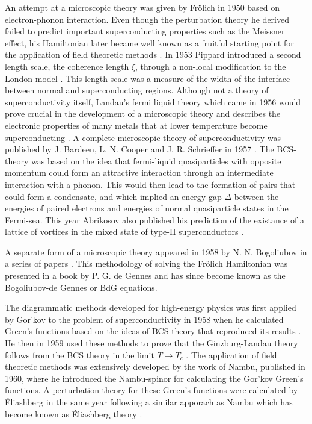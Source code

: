 An attempt at a microscopic theory was given by Fr\"olich in 1950 based on electron-phonon interaction. Even though the perturbation theory he derived
failed to predict important superconducting properties such as the Meissner effect, his Hamiltonian later became well known as a
fruitful starting point for the application of field theoretic methods \cite{Frolich50}.
In 1953 Pippard introduced a second length scale, the coherence length $\xi$, through a non-local modification to the London-model \cite{Pippard53}.
This length scale was a measure of the width of the interface between normal and superconducting regions. Although not a theory of superconductivity
itself, Landau's fermi liquid theory which came in 1956 would prove crucial in the development of a microscopic theory and describes the electronic
properties of many metals that at lower temperature become superconducting \cite{Landau56}. A complete microscopic theory of superconductivity was
published by J. Bardeen, L. N. Cooper and J. R. Schrieffer in 1957 \cite{Bardeen57,BCS}. The BCS-theory was based on the idea that fermi-liquid
quasiparticles with opposite momentum could form an attractive interaction through an intermediate interaction with a phonon. This would then lead
to the formation of pairs that could form a condensate, and which implied an energy gap $\Delta$ between the energies of paired electrons
and energies of normal quasiparticle states in the Fermi-sea. This year Abrikosov also published his prediction of the existance of a lattice of
vortices in the mixed state of type-II superconductors \cite{Abrikosov56}.

A separate form of a microscopic theory appeared in 1958 by N. N. Bogoliubov in a series of papers \cite{Bogoliubov58I, Bogoliubov58III, Bogoliubov58}.
This methodology of solving the Fr\"olich Hamiltonian was presented in a book \cite{deGennes66} by P. G. de Gennes and has since become known as
the Bogoliubov-de Gennes or BdG equations.

The diagrammatic methods developed for high-energy physics was first applied by Gor'kov to the
problem of superconductivity in 1958 when he calculated Green's functions based on the ideas of BCS-theory that reproduced
its results \cite{Gorkov58}. He then in 1959 used these methods to prove that the Ginzburg-Landau theory follows from the BCS theory in the limit $T\to T_c$ \cite{Gorkov59}.
The application of field theoretic methods was extensively developed by the work of Nambu, published in 1960, where he introduced the Nambu-spinor
for calculating the Gor'kov Green's functions. A perturbation theory for these Green's functions were calculated by \'Eliashberg in the same year
following a similar apporach as Nambu which has become known as \'Eliashberg theory \cite{Eliashberg60}.

